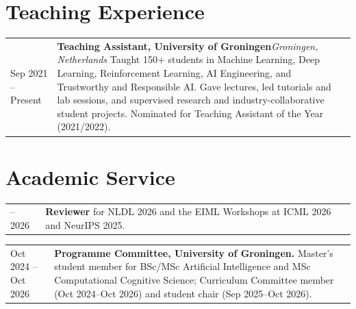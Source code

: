 \documentclass[10pt,a4paper]{article}
\makeatletter
\newcommand{\datedentry}[2]{%
  \begin{tabularx}{\textwidth}{@{}>{\raggedright\arraybackslash}p{3.3cm}@{\hspace{0.15cm}}X@{}}
    #1 & #2
  \end{tabularx}%
}
\makeatother
\begin{document}
\section{Teaching Experience}
\datedentry{Sep 2021 -- Present}{\textbf{Teaching Assistant, University of Groningen}\hfill\textit{Groningen, Netherlands}\newline
Taught 150+ students in Machine Learning, Deep Learning, Reinforcement Learning,
AI Engineering, and Trustworthy and Responsible AI.
Gave lectures, led tutorials and lab sessions, and supervised research and
industry-collaborative student projects.
Nominated for Teaching Assistant of the Year (2021/2022).}

\section{Academic Service}
\datedentry{2025 -- 2026}{\textbf{Reviewer} for NLDL 2026 and the EIML Workshops at ICML 2026 and NeurIPS 2025.}
\datedentry{Oct 2024 -- Oct 2026}{\textbf{Programme Committee, University of Groningen.}\newline
Master's student member for BSc/MSc Artificial Intelligence and MSc Computational Cognitive Science;
Curriculum Committee member (Oct 2024--Oct 2026) and student chair (Sep 2025--Oct 2026).}
\end{document}
